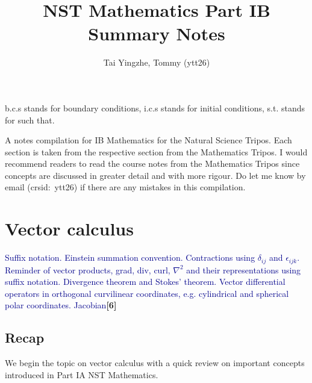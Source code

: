 \documentclass[a4paper]{article}
\title{\textbf{NST Mathematics Part IB Summary Notes}}
\author{Tai Yingzhe, Tommy (ytt26)}
\date{}
\begin{document}
\maketitle
\usetikzlibrary{decorations.markings}
{\small\tableofcontents}
\begin{notation*}
b.c.s stands for boundary conditions, i.c.s stands for initial conditions, s.t. stands for such that.
\end{notation*}
\begin{foreword*}
A notes compilation for IB Mathematics for the Natural Science Tripos. Each section is taken from the respective section from the Mathematics Tripos. I would recommend readers to read the course notes from the Mathematics Tripos since concepts are discussed in greater detail and with more rigour. Do let me know by email (crsid:~ytt26) if there are any mistakes in this compilation.
\end{foreword*}
\newpage
\section{Vector calculus}
{\small\textcolor{darkblue}{Suffix notation. Einstein summation convention. Contractions using $\delta_{ij}$ and $\epsilon_{ijk}$. Reminder of vector products, grad, div, curl, $\nabla^2$ and their representations using suffix notation. Divergence theorem and Stokes' theorem. Vector differential operators in orthogonal curvilinear coordinates, e.g. cylindrical and spherical polar coordinates. Jacobian}\hfill\textbf{[6]}}
\subsection{Recap}
We begin the topic on vector calculus with a quick review on important concepts introduced in Part IA NST Mathematics.
\end{document}
